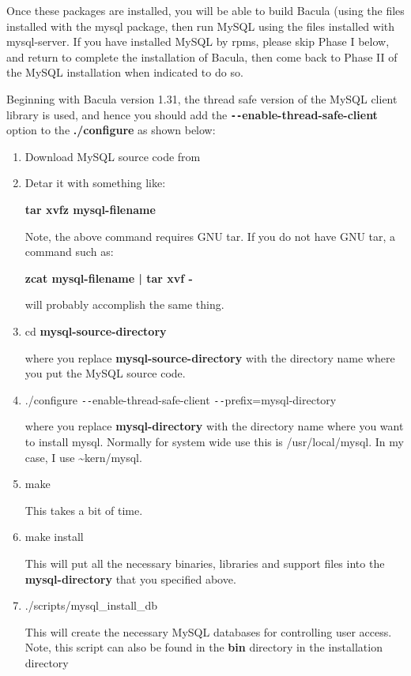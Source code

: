 Once these packages are installed, you will be able to build Bacula (using
the files installed with the mysql package, then run MySQL using the
files installed with mysql-server. If you have installed MySQL by rpms,
please skip Phase I below, and return to complete the installation of
Bacula, then come back to Phase II of the MySQL installation when indicated
to do so.

Beginning with Bacula version 1.31, the thread safe version of the
MySQL client library is used, and hence you should add the {\bf
\verb:--:enable-thread-safe-client} option to the {\bf
./configure} as shown below:

\begin{enumerate}
\item Download MySQL source code from 

\item Detar it with something like:

   {\bf tar xvfz mysql-filename}  

Note, the above command requires GNU tar. If you do not  have GNU tar, a
command such as:

{\bf zcat mysql-filename | tar xvf - }  

will probably accomplish the same thing. 

\item cd {\bf mysql-source-directory}

   where you replace {\bf mysql-source-directory} with the  directory name where
   you put the MySQL source code.  

\item ./configure \verb:--:enable-thread-safe-client \verb:--:prefix=mysql-directory

   where you replace {\bf mysql-directory} with the directory  name where you
   want to install mysql. Normally for system  wide use this is /usr/local/mysql.
   In my case, I use  \~{}kern/mysql.  

\item make

   This takes a bit of time.  

\item make install

   This will put all the necessary binaries, libraries and support  files into
   the {\bf mysql-directory} that you specified above.  

\item ./scripts/mysql\_install\_db

   This will create the necessary MySQL databases for controlling  user access.
Note, this script can also be found in the  {\bf bin} directory in the
installation directory 

\end{enumerate}

